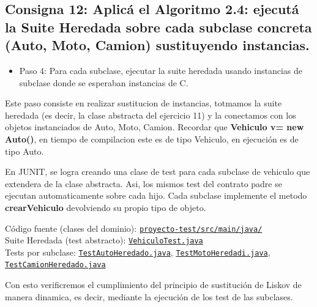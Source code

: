 \subsection{Consigna 12: Aplicá el Algoritmo 2.4: ejecutá la Suite Heredada sobre cada subclase concreta (Auto, Moto, Camion) sustituyendo instancias.}

\begin{itemize}
    \item Paso 4: Para cada subclase, ejecutar la suite heredada usando instancias de subclase donde se esperaban instancias de C.
\end{itemize}


Este paso consiste en realizar sustitucion de instancias, totmamos la suite heredada (es decir, la clase abstracta del ejercicio 11) y la conectamos con los objetos instanciados de Auto, Moto, Camion. Recordar que \textbf{Vehiculo v= new Auto()}, en tiempo de compilacion este es de tipo Vehiculo, en ejecución es de tipo Auto.

En JUNIT, se logra creando una clase de test para cada subclase de vehiculo que extendera de la clase abstracta. Asi, los mismos test del contrato padre se ejecutan automaticamente sobre cada hijo.
Cada subclase implemente el metodo \textbf{crearVehiculo} devolviendo su propio tipo de objeto.

Código fuente (clases del dominio): \href{https://github.com/Cristopher-Ovaillos/Unidad_2_ValidacionVerificacion/tree/main/Unidad_2_code/proyecto-test/src/main/java/com/ejercicio_2/}{\texttt{proyecto-test/src/main/java/}} \\
Suite Heredada (test abstracto): \href{https://github.com/Cristopher-Ovaillos/Unidad_2_ValidacionVerificacion/blob/main/Unidad_2_code/proyecto-test/src/test/java/com/ejercicio_2/VehiculoTest.java}{\texttt{VehiculoTest.java}} \\
Tests por subclase: \href{https://github.com/Cristopher-Ovaillos/Unidad_2_ValidacionVerificacion/blob/main/Unidad_2_code/proyecto-test/src/test/java/com/ejercicio_2/TestAutoHeredado.java}{\texttt{TestAutoHeredado.java}}, \href{https://github.com/Cristopher-Ovaillos/Unidad_2_ValidacionVerificacion/blob/main/Unidad_2_code/proyecto-test/src/test/java/com/ejercicio_2/TestMotoHeredadi.java}{\texttt{TestMotoHeredadi.java}}, \href{https://github.com/Cristopher-Ovaillos/Unidad_2_ValidacionVerificacion/blob/main/Unidad_2_code/proyecto-test/src/test/java/com/ejercicio_2/TestCamionHeredado.java}{\texttt{TestCamionHeredado.java}}

Con esto verificremos el cumplimiento del principio de sustitución de Liskov de manera dinamica, es decir, mediante la ejecución de los test de las subclases.


